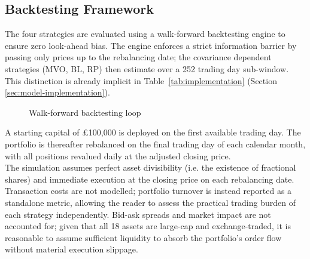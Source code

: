 \documentclass[a4paper,alpha-refs]{scr-contemporary}
\numberwithin{equation}{section}
\begin{document}
\subsection{Backtesting Framework}
\indent \indent The four strategies are evaluated using a walk-forward backtesting 
engine to ensure zero look-ahead bias. The engine enforces a strict information 
barrier by passing only prices up to the rebalancing date; the covariance dependent 
strategies (MVO, BL, RP) then estimate over a 252 trading day sub-window. 
This distinction is already implicit in Table~\ref{tab:implementation}
(Section \ref{sec:model-implementation}). \\

\begin{figure}[htbp]                                                                                          
\centering
{}
\caption{Walk-forward backtesting loop}
\label{fig:backtest_loop}
\end{figure}

\indent A starting capital of \pounds 100{,}000 is deployed on the first available 
trading day. The portfolio is thereafter rebalanced on the final trading day of each
calendar month, with all positions revalued daily at the adjusted closing price. \\

\indent The simulation assumes perfect asset divisibility (i.e. the existence of fractional
shares) and immediate execution at the closing price on each rebalancing date. Transaction
costs are not modelled; portfolio turnover is instead reported as a standalone metric, allowing
the reader to assess the practical trading burden of each strategy independently.
\indent Bid-ask spreads and market impact are not accounted for; given that
all 18 assets are large-cap and exchange-traded, it is reasonable to assume
sufficient liquidity to absorb the portfolio's order flow without material
execution slippage. \\
\end{document}
